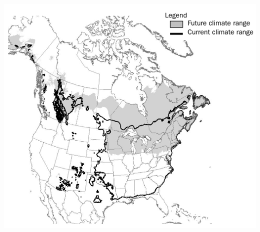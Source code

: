 \documentclass{eecslides}
\begin{document}
	\begin{frame}
		\begin{center}
			\includegraphics[height=0.65\textheight]{mckenney}
		\end{center}
	\end{frame}

\end{document}
